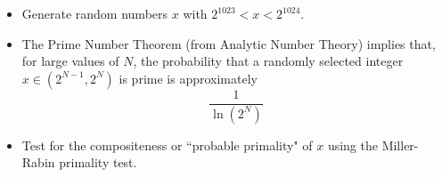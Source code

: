 \begin{itemize}
\item	Generate random numbers $x$ with $2^{1023} < x < 2^{1024}$.
\item	The Prime Number Theorem (from Analytic Number Theory) implies that, for large values of $N$,
	the probability that a randomly selected integer $x \in (2^{N-1},2^{N})$ is prime is
	approximately
	\begin{equation*}
	\dfrac{1}{\ln(2^{N})}
	\end{equation*}
\item	Test for the compositeness or ``probable primality" of $x$
	using the Miller-Rabin primality test.
\end{itemize}

